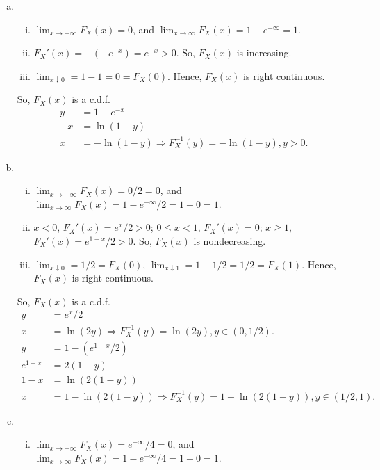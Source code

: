 \documentclass[14pt]{elegantbook}
\begin{document}
    \begin{solution}
        \begin{enumerate}[(a)]
            \item \begin{enumerate}[i)]
                \item $\lim_{x\to-\infty}F_X(x)=0$, and $\lim_{x\to\infty}F_X(x)=1-e^{-\infty}=1$. 
                \item $F_X'(x)=-(-e^{-x})=e^{-x}>0$. So, $F_X(x)$ is increasing. 
                \item $\lim_{x\downarrow 0}=1-1=0=F_X(0)$. Hence, $F_X(x)$ is right continuous. 
              \end{enumerate}
              So, $F_X(x)$ is a c.d.f. 
              \begin{align*}
                y&=1-e^{-x}\\
                -x&=\ln(1-y)\\
                x&=-\ln(1-y)\Rightarrow F_X^{-1}(y)=-\ln(1-y), y>0. 
              \end{align*}
            \item \begin{enumerate}[i)]
                \item $\lim_{x\to-\infty}F_X(x)=0/2=0$, and $\lim_{x\to\infty}F_X(x)=1-e^{-\infty}/2=1-0=1$. 
                \item $x<0$, $F_X'(x)=e^x/2>0$; $0\leq x<1$, $F_X'(x)=0$; $x\geq 1$, $F_X'(x)=e^{1-x}/2>0$. So, $F_X(x)$ is nondecreasing. 
                \item $\lim_{x\downarrow 0}=1/2=F_X(0)$, $\lim_{x\downarrow 1}=1-1/2=1/2=F_X(1)$. Hence, $F_X(x)$ is right continuous. 
              \end{enumerate}
              So, $F_X(x)$ is a c.d.f. 
              \begin{align*}
                y&=e^x/2\\
                x&=\ln(2y)\Rightarrow F_X^{-1}(y)=\ln(2y), y\in(0,1/2). \\
                y&=1-(e^{1-x}/2)\\
                e^{1-x}&=2(1-y)\\
                1-x&=\ln(2(1-y))\\
                x&=1-\ln(2(1-y))\Rightarrow F_X^{-1}(y)=1-\ln(2(1-y)), y\in(1/2,1).
              \end{align*}
            \item \begin{enumerate}[i)]
                \item $\lim_{x\to-\infty}F_X(x)=e^{-\infty}/4=0$, and $\lim_{x\to\infty}F_X(x)=1-e^{-\infty}/4=1-0=1$. 

\end{enumerate}
\end{enumerate}
\end{solution}
\end{document}
